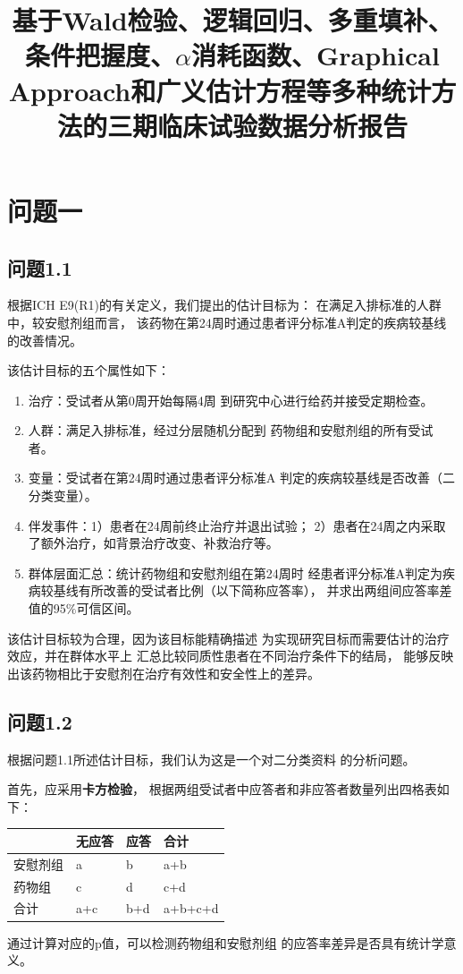 \documentclass{article}
\title{基于Wald检验、逻辑回归、多重填补、条件把握度、$\alpha$消耗函数、Graphical Approach和广义估计方程等多种统计方法的三期临床试验数据分析报告}
\author{}
\date{}
\begin{document}
	\maketitle
	\tableofcontents

\section{问题一}
\subsection{问题1.1}
根据ICH E9(R1)的有关定义，我们提出的估计目标为：
在满足入排标准的人群中，较安慰剂组而言，
该药物在第24周时通过患者评分标准A判定的疾病较基线的改善情况。

该估计目标的五个属性如下：
\begin{enumerate}
    \item 治疗：受试者从第0周开始每隔4周
    到研究中心进行给药并接受定期检查。
    \item 人群：满足入排标准，经过分层随机分配到
    药物组和安慰剂组的所有受试者。
    \item 变量：受试者在第24周时通过患者评分标准A
    判定的疾病较基线是否改善（二分类变量）。
    \item 伴发事件：1）患者在24周前终止治疗并退出试验；
    2）患者在24周之内采取了额外治疗，如背景治疗改变、补救治疗等。
    \item 群体层面汇总：统计药物组和安慰剂组在第24周时
    经患者评分标准A判定为疾病较基线有所改善的受试者比例（以下简称应答率），
    并求出两组间应答率差值的95$\%$可信区间。
\end{enumerate}

该估计目标较为合理，因为该目标能精确描述
为实现研究目标而需要估计的治疗效应，并在群体水平上
汇总比较同质性患者在不同治疗条件下的结局，
能够反映出该药物相比于安慰剂在治疗有效性和安全性上的差异。

\subsection{问题1.2}
根据问题1.1所述估计目标，我们认为这是一个对二分类资料
的分析问题。

首先，应采用\textbf{卡方检验}，
根据两组受试者中应答者和非应答者数量列出四格表如下：
\begin{table}[H]
    \centering
    \begin{tabular}{llll}
    \hline
         & 无应答 & 应答 &   合计      \\ 
    \hline
    安慰剂组 & a    & b    & a+b     \\
    药物组  & c    & d    & c+d     \\
    \hline
     合计    & a+c  & b+d  & a+b+c+d \\ 
    \hline
    \end{tabular}
    \end{table}
通过计算对应的p值，可以检测药物组和安慰剂组
的应答率差异是否具有统计学意义。
\end{document}

